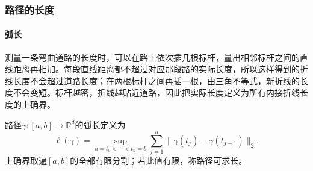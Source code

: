 \subsubsection{路径的长度}

\paragraph{弧长}

测量一条弯曲道路的长度时，可以在路上依次插几根标杆，量出相邻标杆之间的直线距离再相加。每段直线距离都不超过对应那段路的实际长度，所以这样得到的折线长度不会超过道路长度；在两根标杆之间再插一根，由三角不等式，新折线的长度不会变短。标杆越密，折线越贴近道路，因此把实际长度定义为所有内接折线长度的上确界。
\begin{definition}[路径的弧长]
路径$\gamma:[a,b]\to\mathbb R^d$的弧长定义为
\[
 \ell(\gamma)=\sup_{a=t_0<\cdots<t_n=b}
 \sum_{j=1}^n\lVert\gamma(t_j)-\gamma(t_{j-1})\rVert_2.
\]
上确界取遍$[a,b]$的全部有限分割；若此值有限，称路径可求长。
\end{definition}

